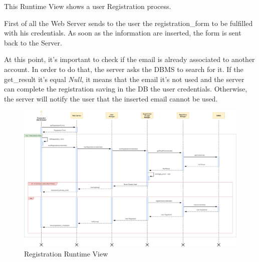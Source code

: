 \newpage
{}
This Runtime View shows a user Registration process.\par
First of all the Web Server sends to the user the registration\_form to be fulfilled with his credentials. As soon as the information are inserted, the form is sent back to the Server.\par
At this point, it’s important to check if the email is already associated to another account. In order to do that, the server asks the DBMS to search for it. If the get\_result it’s equal \emph{Null}, it means that the email it’s not used and the server can complete the registration saving in the DB the user credentials. Otherwise, the server will notify the user that the inserted email cannot be used.
\begin{figure}[H]
	\centering
	\includegraphics[scale=0.2]{Images/Runtime/Registration}
	\caption{Registration Runtime View}
\end{figure}


